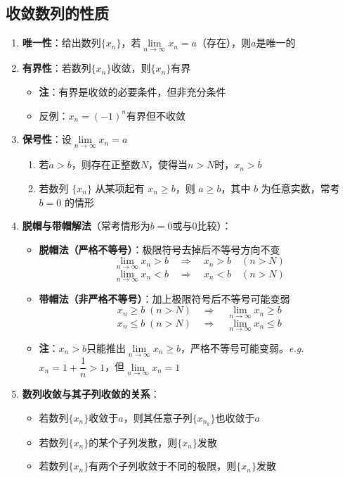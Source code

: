 \documentclass[../book.tex]{subfiles}
\begin{document}
    \subsection{收敛数列的性质}
    \begin{enumerate}
        \item \textbf{唯一性}：给出数列$\{x_n\}$，若$\lim\limits_{n\to\infty} x_n = a$（存在），则$a$是唯一的

        \item \textbf{有界性}：若数列$\{x_n\}$收敛，则$\{x_n\}$有界
        \begin{itemize}
            \item \textbf{注}：有界是收敛的必要条件，但非充分条件
            \item 反例：$x_n = (-1)^n$有界但不收敛
        \end{itemize}

        \item \textbf{保号性}：设$\lim\limits_{n\to\infty} x_n = a$
        \begin{enumerate}
            \item 若$a > b$，则存在正整数$N$，使得当$n > N$时，$x_n > b$
            \item 若数列 $\{x_n\}$ 从某项起有 $x_n \geq b$，则 $a \geq b$，其中 $b$ 为任意实数，常考 $b = 0$ 的情形
        \end{enumerate}

        \item \textbf{脱帽与带帽解法}（常考情形为$b = 0$或与$0$比较）：
        \begin{itemize}
            \item \textbf{脱帽法（严格不等号）}：极限符号去掉后不等号方向不变
            \[
                \lim_{n\to\infty} x_n > b \quad \Rightarrow \quad x_n > b \quad (n > N)
            \]
            \[
                \lim_{n\to\infty} x_n < b \quad \Rightarrow \quad x_n < b \quad (n > N)
            \]

            \item \textbf{带帽法（非严格不等号）}：加上极限符号后不等号可能变弱
            \[
                x_n \ge b \;(n > N) \quad \Rightarrow \quad \lim_{n\to\infty} x_n \ge b
            \]
            \[
                x_n \le b \;(n > N) \quad \Rightarrow \quad \lim_{n\to\infty} x_n \le b
            \]
            \item \textbf{注}：$x_n > b$只能推出$\lim\limits_{n\to\infty} x_n \ge b$，严格不等号可能变弱。\emph{e.g.} $x_n = 1 + \dfrac{1}{n} > 1$，但$\lim\limits_{n\to\infty} x_n = 1$
        \end{itemize}
        \item \textbf{数列收敛与其子列收敛的关系}：
        \begin{itemize}
            \item 若数列$\{x_n\}$收敛于$a$，则其任意子列$\{x_{n_k}\}$也收敛于$a$
            \item 若数列$\{x_n\}$的某个子列发散，则$\{x_n\}$发散
            \item 若数列$\{x_n\}$有两个子列收敛于不同的极限，则$\{x_n\}$发散
        \end{itemize}
    \end{enumerate}
\end{document}
